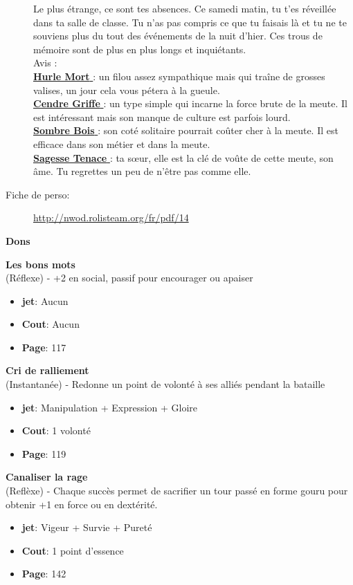 \documentclass[oneside,12pt]{book}
\newcommand\don[6]{
\textbf{#1} \\
(#6) - #2
\begin{itemize}
\item{ \textbf{jet}: #3}
\item{ \textbf{Cout}: #4}
\item{ \textbf{Page}: #5}
\end{itemize}
\vspace{0.5cm}
}
\newcommand{\Jessica}{\textbf{Sagesse Tenace} }
\newcommand{\Luke}{\textbf{Cendre Griffe} }
\newcommand{\Peter}{\textbf{Hurle Mort} }
\newcommand{\Leonard}{\textbf{Sombre Bois} }
\begin{document}
\begin{flushleft}
\begin{description}
{Le plus étrange, ce sont tes absences. Ce samedi matin, tu t'es réveillée dans ta salle de classe. Tu n'as pas compris ce que tu faisais là et tu ne te souviens plus du tout des événements de la nuit d'hier. Ces trous de mémoire sont de plus en plus longs et inquiétants. \\
Avis :\\
\underline{\Peter} : un filou assez sympathique mais qui traîne de grosses valises, un jour cela vous pétera à la gueule.\\
\underline{\Luke} : un type simple qui incarne la force brute de la meute. Il est intéressant mais son manque de culture est parfois lourd.\\
\underline{\Leonard} : son coté solitaire pourrait coûter cher à la meute. Il est efficace dans son métier et dans la meute.\\
\underline{\Jessica}: ta sœur, elle est la clé de voûte de cette meute, son âme. Tu regrettes un peu de n'être pas comme elle.\\
}
\item[Fiche de perso:]{\href{http://nwod.rolisteam.org/fr/pdf/14}{http://nwod.rolisteam.org/fr/pdf/14}}
\end{description}

\clearpage
\textbf{\large Dons} 
\vspace{0.5cm}

\don{Les bons mots}{+2 en social, passif pour encourager ou apaiser}{Aucun}{Aucun}{117}{Réflexe}
\don{Cri de ralliement}{Redonne un point de volonté à ses alliés pendant la bataille}{Manipulation + Expression + Gloire}{1 volonté}{119}{Instantanée}
\don{Canaliser la rage}{Chaque succès permet de sacrifier un tour passé en forme gouru pour obtenir +1 en force ou en dextérité.}{Vigeur + Survie + Pureté}{1 point d'essence}{142}{Reflèxe}

\clearpage

\end{flushleft}
\end{document}

